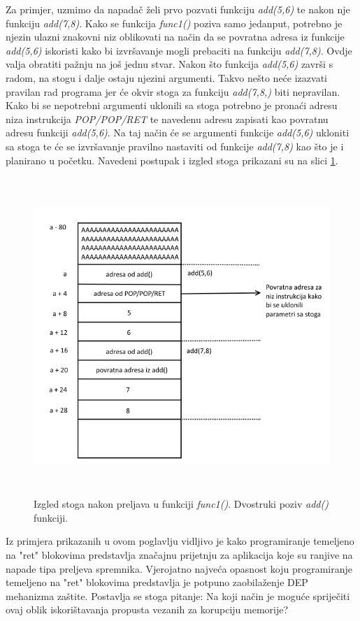 \documentclass[times, utf8, diplomski, numeric]{fer}
\begin{document}
Za primjer, uzmimo da napadač želi prvo pozvati funkciju \emph{add(5,6)} te nakon nje funkciju \emph{add(7,8)}. Kako se funkcija \emph{func1()} poziva samo jedanput, potrebno je njezin ulazni znakovni niz oblikovati na način da se povratna adresa iz funkcije \emph{add(5,6)} iskoristi kako bi izvršavanje mogli prebaciti na funkciju \emph{add(7,8)}. Ovdje valja obratiti pažnju na još jednu stvar. Nakon što funkcija \emph{add(5,6)} završi s radom, na stogu i dalje ostaju njezini argumenti. Takvo nešto neće izazvati pravilan rad programa jer će okvir stoga za funkciju \emph{add(7,8,)} biti nepravilan. Kako bi se nepotrebni argumenti uklonili sa stoga potrebno je pronaći adresu niza instrukcija \emph{POP/POP/RET} te navedenu adresu zapisati kao povratnu adresu funkciji \emph{add(5,6)}. Na taj način će se argumenti funkcije \emph{add(5,6)} ukloniti sa stoga te će se izvršavanje pravilno nastaviti od funkcije \emph{add(7,8)} kao što je i planirano u početku. Navedeni postupak i izgled stoga prikazani su na slici \ref{fig:rop_add78}. 
\pagebreak
\begin{figure}[!htb]
\centering
\setlength\fboxsep{0pt}
\setlength\fboxrule{0.5pt}
\includegraphics[width=12cm, height=12cm]{slike/rop_add78}
\caption{Izgled stoga nakon preljava u funkciji \emph{func1()}. Dvostruki poziv \emph{add()} funkciji.}
\label{fig:rop_add78} 
\end{figure}
Iz primjera prikazanih u ovom poglavlju vidljivo je kako programiranje temeljeno na "ret" blokovima predstavlja značajnu prijetnju za aplikacija koje su ranjive na napade tipa preljeva spremnika. Vjerojatno najveća opasnost koju programiranje temeljeno na "ret" blokovima predstavlja je potpuno zaobilaženje DEP mehanizma zaštite. Postavlja se stoga pitanje: Na koji način je moguće spriječiti ovaj oblik iskorištavanja propusta vezanih za korupciju memorije? 
\end{document}
